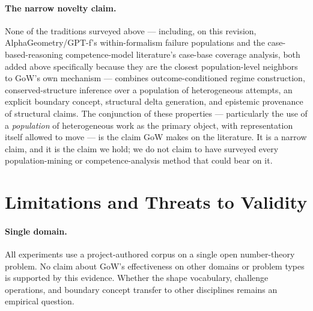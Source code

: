 \documentclass[11pt]{article}
\theoremstyle{gowthm}
\theoremstyle{gowplain}
\begin{document}
\paragraph{The narrow novelty claim.}
None of the traditions surveyed above --- including, on this revision,
AlphaGeometry/GPT-f's within-formalism failure populations and the
case-based-reasoning competence-model literature's case-base coverage
analysis, both added above specifically because they are the closest
population-level neighbors to GoW's own mechanism --- combines outcome-conditioned regime construction,
conserved-structure inference over a population of heterogeneous attempts, an
explicit boundary concept, structural delta generation, and epistemic provenance
of structural claims. The conjunction of these properties --- particularly the
use of a \emph{population} of heterogeneous work as the primary object,
with representation itself allowed to move --- is the claim GoW makes on the
literature. It is a narrow claim, and it is the claim we hold; we do not claim
to have surveyed every population-mining or competence-analysis method that
could bear on it.

\section{Limitations and Threats to Validity}
\label{sec:limitations}

\paragraph{Single domain.}
All experiments use a project-authored corpus on a single open number-theory
problem. No claim about GoW's effectiveness on other domains or problem types
is supported by this evidence. Whether the shape vocabulary, challenge
operations, and boundary concept transfer to other disciplines remains an
empirical question.
\end{document}
